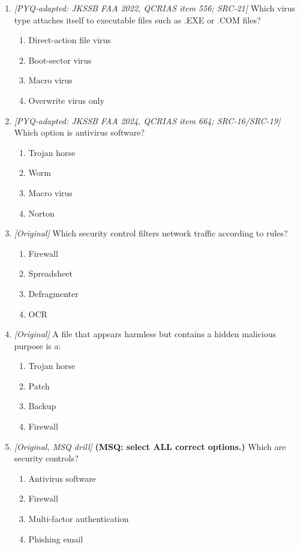 \begin{enumerate}[label=\textbf{Q\arabic*.}, leftmargin=*]
\begin{enumerate}[label=\Alph*.]
    \item Hacking with damage is punishable under the Act.
    \item The IT Act bans the use of all computers.
  \end{enumerate}
\item \textit{[PYQ-adapted: JKSSB FAA 2022, QCRIAS item 556; SRC-21]} Which virus type attaches itself to executable files such as .EXE or .COM files?
  \begin{enumerate}[label=\Alph*.]
\item Direct-action file virus
   \item Boot-sector virus
   \item Macro virus
   \item Overwrite virus only
  \end{enumerate}

\item \textit{[PYQ-adapted: JKSSB FAA 2024, QCRIAS item 664; SRC-16/SRC-19]} Which option is antivirus software?
  \begin{enumerate}[label=\Alph*.]
\item Trojan horse
   \item Worm
   \item Macro virus
   \item Norton
  \end{enumerate}

\item \textit{[Original]} Which security control filters network traffic according to rules?
  \begin{enumerate}[label=\Alph*.]
\item Firewall
   \item Spreadsheet
   \item Defragmenter
   \item OCR
  \end{enumerate}

\item \textit{[Original]} A file that appears harmless but contains a hidden malicious purpose is a:
  \begin{enumerate}[label=\Alph*.]
\item Trojan horse
   \item Patch
   \item Backup
   \item Firewall
  \end{enumerate}

\item \textit{[Original, MSQ drill]} \textbf{(MSQ: select ALL correct options.)} Which are security controls?
  \begin{enumerate}[label=\Alph*.]
\item Antivirus software
   \item Firewall
   \item Multi-factor authentication
   \item Phishing email
  \end{enumerate}

\end{enumerate}
